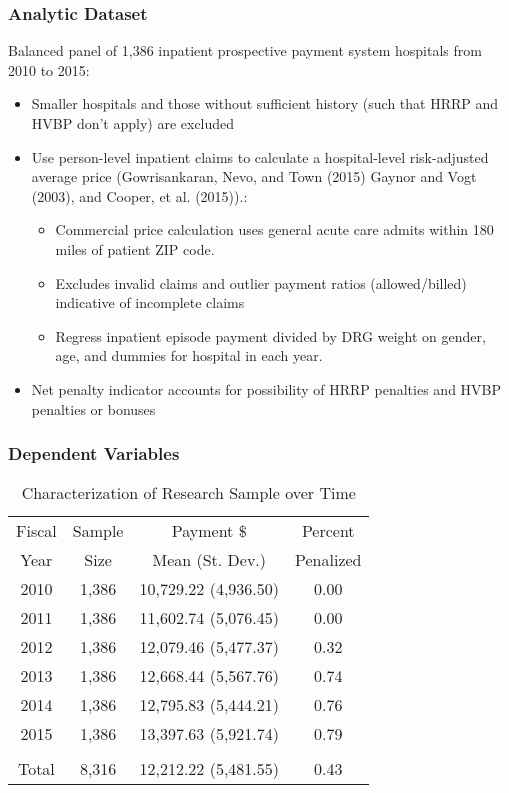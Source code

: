 \documentclass{beamer}
\begin{document}
\begin{frame}
\frametitle{Analytic Dataset}
Balanced panel of 1,386 inpatient prospective payment system hospitals from 2010 to 2015:
\begin{itemize}
\item Smaller hospitals and those without sufficient history (such that HRRP and HVBP don't apply) are excluded
\item Use person-level inpatient claims to calculate a hospital-level risk-adjusted average price (Gowrisankaran, Nevo, and Town (2015) Gaynor and Vogt (2003), and Cooper, et al. (2015)).: 
    \begin{itemize}
    \item Commercial price calculation uses general acute care admits within 180 miles of patient ZIP code.
    \item Excludes invalid claims and outlier payment ratios (allowed/billed) indicative of incomplete claims
    \item Regress inpatient episode payment divided by DRG weight on gender, age, and dummies for hospital in each year.
    \end{itemize}
\item Net penalty indicator accounts for possibility of HRRP penalties and HVBP penalties or bonuses
\end{itemize}
\end{frame}

\begin{frame}
\frametitle{Dependent Variables}
\begin{table}[htp]
\centering \normalsize
\caption{Characterization of Research Sample over Time}
\label{tab:samplemort}
\begin{tabular}{cccc}
\hline \hline
Fiscal & Sample 		&  Payment $\$$			& Percent \\
Year   &  Size    		&  Mean (St. Dev.) 			& Penalized \\
 \hline
2010 &      1,386		& 	10,729.22   (4,936.50)	& 0.00  \\
2011 &      1,386		& 	11,602.74   (5,076.45)	& 0.00   \\
2012 & 	1,386 		& 	12,079.46   (5,477.37) 	& 0.32   \\
2013 & 	1,386		& 	12,668.44   (5,567.76)	& 0.74  \\
2014 & 	1,386		&	12,795.83   (5,444.21)	& 0.76 \\
2015 &     1,386		& 	13,397.63   (5,921.74)	& 0.79 \\
&&&\\
\hline
Total & 	8,316		& 12,212.22   (5,481.55)	&	 0.43 \\
\hline
\end{tabular}
\end{table}
\end{frame}
\end{document}
